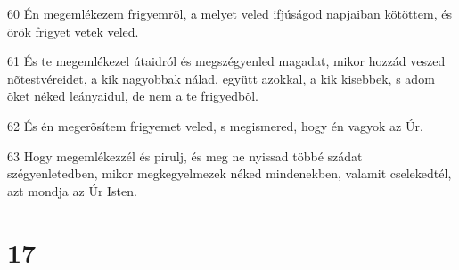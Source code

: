 \par 60 Én megemlékezem frigyemrõl, a melyet veled ifjúságod napjaiban kötöttem, és örök frigyet vetek veled.
\par 61 És te megemlékezel útaidról és megszégyenled magadat, mikor hozzád veszed nõtestvéreidet, a kik nagyobbak nálad, együtt azokkal, a kik kisebbek, s adom õket néked leányaidul, de nem a te frigyedbõl.
\par 62 És én megerõsítem frigyemet veled, s megismered, hogy én vagyok az Úr.
\par 63 Hogy megemlékezzél és pirulj, és meg ne nyissad többé szádat szégyenletedben, mikor megkegyelmezek néked mindenekben, valamit cselekedtél, azt mondja az Úr Isten.

\chapter{17}

